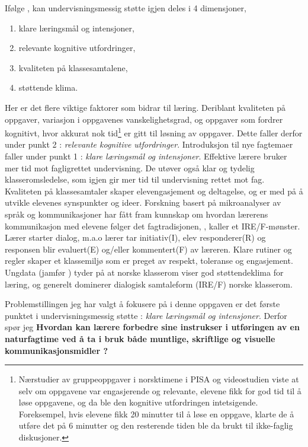 \documentclass[main.tex]{subfiles}
\begin{document}
Ifølge , kan undervisningsmessig støtte igjen deles i 4 dimensjoner,
\begin{enumerate}
\item klare læringsmål og intensjoner,
\item relevante kognitive utfordringer,
\item kvaliteten på klassesamtalene,
\item støttende klima.
\end{enumerate}
Her er det flere viktige faktorer som bidrar til læring. Deriblant kvaliteten på oppgaver, variasjon i
oppgavenes vanskelighetsgrad, og oppgaver som fordrer kognitivt, hvor akkurat nok tid\footnote{
Nærstudier av gruppeoppgaver i norsktimene i PISA og videostudien  viste at selv om oppgavene
var engasjerende og relevante, elevene fikk for god tid til å løse oppgavene, og da ble den kognitive utfordringen 
intetsigende. Foreksempel, hvis elevene fikk 20 minutter til å løse en oppgave, klarte de å utføre det på 6 
minutter og den resterende tiden ble da brukt til ikke-faglig diskusjoner.} er gitt til løsning av oppgaver. 
Dette faller derfor under punkt 2 : \emph{relevante kognitive utfordringer}. 
Introduksjon til nye fagtemaer faller under punkt 1 : 
\emph{klare læringsmål og intensjoner}. Effektive lærere bruker mer tid mot fagligrettet undervisning. 
De utøver også klar og tydelig klasseromsledelse, som igjen gir mer tid til undervisning rettet mot fag. 
Kvaliteten på klassesamtaler skaper elevengasjement og deltagelse, og er med på å utvikle elevenes synspunkter og ideer. 
Forskning basert på mikroanalyser av språk og kommunikasjoner har fått fram kunnskap om hvordan lærerens kommunikasjon
med elevene følger det fagtradisjonen, , kaller et IRE/F-mønster. Lærer starter dialog, m.a.o lærer tar 
initiativ(I), elev responderer(R) og responsen blir evaluert(E) og/eller kommentert(F) av læreren.
Klare rutiner og regler skaper et klassemiljø som er preget av respekt, toleranse og engasjement. 
Ungdata (jamfør ) tyder på at norske klasserom viser god støttendeklima for læring, og generelt dominerer 
dialogisk samtaleform (IRE/F) norske klasserom.
\newline

Problemstillingen jeg har valgt å fokusere på i denne oppgaven er det første punktet i undervisningsmessig støtte : 
\emph{klare læringsmål og intensjoner}. Derfor spør jeg 
\newline
\textbf{Hvordan kan lærere forbedre sine instrukser i utføringen av en naturfagtime ved å ta i bruk både muntlige,
skriftlige og visuelle kommunikasjonsmidler ?}
\newline
\end{document}
